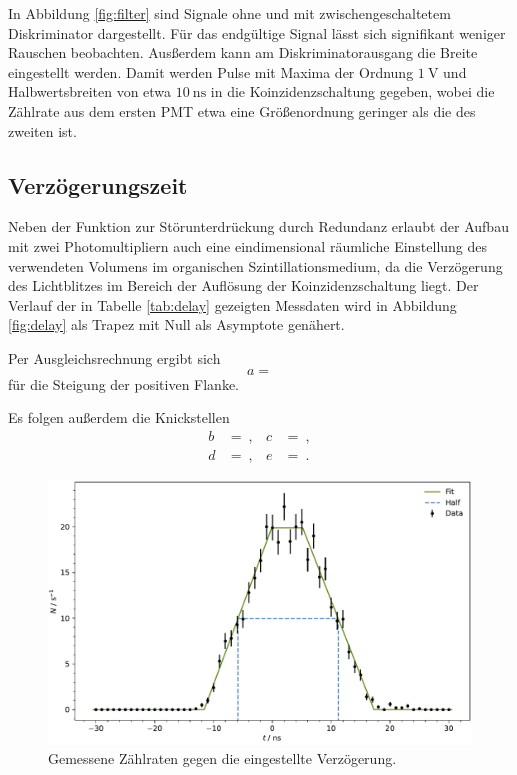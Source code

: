 In Abbildung \eqref{fig:filter} sind Signale ohne und mit zwischengeschaltetem Diskriminator dargestellt. Für das endgültige Signal
lässt sich signifikant weniger Rauschen beobachten. Ausßerdem kann am Diskriminatorausgang die Breite eingestellt werden. Damit
werden Pulse mit Maxima der Ordnung $\qty{1}{\volt}$ und Halbwertsbreiten von etwa $\qty{10}{\nano\second}$ in die
Koinzidenzschaltung gegeben, wobei die Zählrate aus dem ersten PMT etwa eine Größenordnung geringer als die des
zweiten ist.



\subsection{Verzögerungszeit}

Neben der Funktion zur Störunterdrückung durch Redundanz erlaubt der Aufbau mit zwei Photomultipliern auch eine eindimensional
räumliche Einstellung des verwendeten Volumens im organischen Szintillationsmedium, da die Verzögerung des Lichtblitzes im Bereich
der Auflösung der Koinzidenzschaltung liegt. Der Verlauf der in Tabelle \eqref{tab:delay} gezeigten Messdaten wird in Abbildung
\eqref{fig:delay} als Trapez mit Null als Asymptote genähert.

Per Ausgleichsrechnung ergibt sich
\begin{equation*}
	a = 
\end{equation*}
für die Steigung der positiven Flanke.

Es folgen außerdem die Knickstellen
\begin{align*}
	b &=  \: , & c &=  \: , \\
	d &=  \: , & e &=  \: .
\end{align*}

\begin{figure}[H]
	\centering
	\includegraphics[width=\textwidth]{build/delay.pdf}
	\caption{Gemessene Zählraten gegen die eingestellte Verzögerung.}
	\label{fig:delay}
\end{figure}

